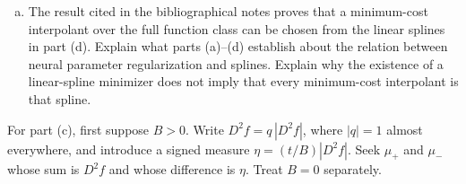 \begin{exercisechunk}
\begin{enumerate}[(a),beginpenalty=10000]
\item The result cited in the bibliographical notes proves that a
minimum-cost interpolant over the full function class can be chosen from the
linear splines in part (d). Explain what parts (a)--(d) establish about the
relation between neural parameter regularization and splines. Explain why
the existence of a linear-spline minimizer does not imply that every
minimum-cost interpolant is that spline.
\end{enumerate}
\begin{hints}
For part (c), first suppose \(B>0\). Write
\(D^2f=q\,|D^2f|\), where \(|q|=1\) almost everywhere, and introduce a
signed measure \(\eta=(t/B)|D^2f|\). Seek \(\mu_+\) and \(\mu_-\) whose sum
is \(D^2f\) and whose difference is \(\eta\). Treat \(B=0\) separately.
\end{hints}
\end{exercisechunk}
